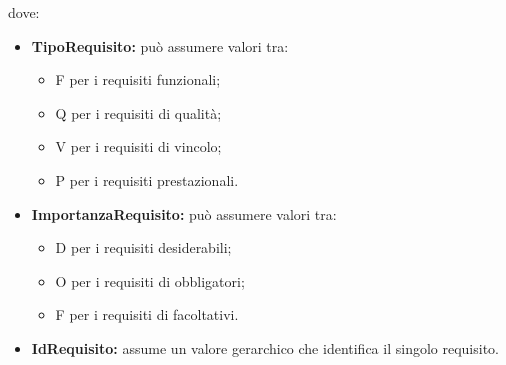 	dove:
	\begin{itemize}
		\item \textbf{TipoRequisito:} può assumere valori tra:
		\begin{itemize}
			\item F per i requisiti funzionali;
			\item Q per i requisiti di qualità;
			\item V per i requisiti di vincolo;
			\item P per i requisiti prestazionali.
		\end{itemize}
		\item \textbf{ImportanzaRequisito:} può assumere valori tra:
		\begin{itemize}
			\item D per i requisiti desiderabili;		
			\item O per i requisiti di obbligatori;
			\item F per i requisiti di facoltativi.
		\end{itemize}

		\item \textbf{IdRequisito:} assume un valore gerarchico che identifica il singolo requisito.
	
	\end{itemize}
